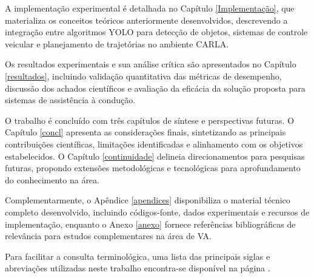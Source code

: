 \documentclass[
	12pt,				%
	oneside, %
	a4paper,			%
	english,			%
	french,				%
	spanish,			%
	brazil				%
	]{abntex2}
\begin{document}
A implementação experimental é detalhada no Capítulo \ref{Implementação}, que materializa os conceitos teóricos anteriormente desenvolvidos, descrevendo a integração entre algoritmos YOLO para detecção de objetos, sistemas de controle veicular e planejamento de trajetórias no ambiente CARLA.

Os resultados experimentais e sua análise crítica são apresentados no Capítulo \ref{resultados}, incluindo validação quantitativa das métricas de desempenho, discussão dos achados científicos e avaliação da eficácia da solução proposta para sistemas de assistência à condução.

O trabalho é concluído com três capítulos de síntese e perspectivas futuras. O Capítulo \ref{concl} apresenta as considerações finais, sintetizando as principais contribuições científicas, limitações identificadas e alinhamento com os objetivos estabelecidos. O Capítulo \ref{continuidade} delineia direcionamentos para pesquisas futuras, propondo extensões metodológicas e tecnológicas para aprofundamento do conhecimento na área.

Complementarmente, o Apêndice \ref{apendices} disponibiliza o material técnico completo desenvolvido, incluindo códigos-fonte, dados experimentais e recursos de implementação, enquanto o Anexo \ref{anexo} fornece referências bibliográficas de relevância para estudos complementares na área de VA.

Para facilitar a consulta terminológica, uma lista das principais siglas e abreviações utilizadas neste trabalho encontra-se disponível na página \pageref{eq:1}.



%
\end{document}

